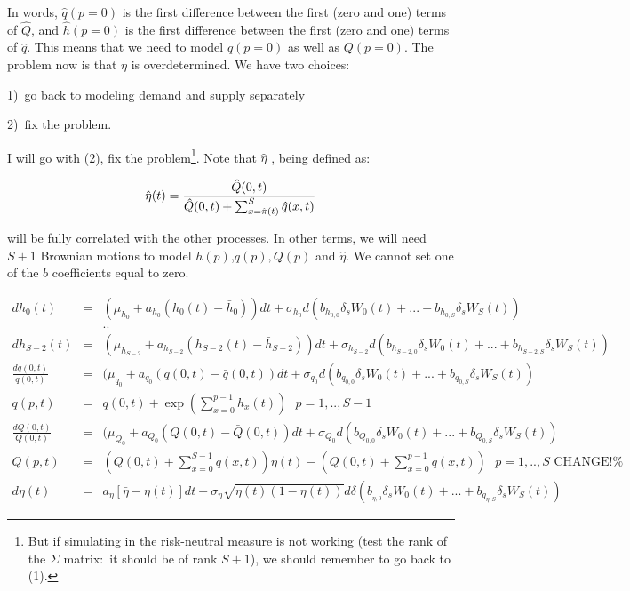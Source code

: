 \documentclass{article}
\begin{document}
In words, $\hat{q}(p=0)$ is the first difference between the first (zero and
one) terms of $\hat{Q}$, and $\hat{h}(p=0)$ is the first difference between
the first (zero and one) terms of $\hat{q}$. This means that we need to
model $q(p=0)$ as well as $Q(p=0)$. The problem now is that $\eta $ is
overdetermined. We have two choices:

1)\ go back to modeling demand and supply separately

2)\ fix the problem.

I will go with (2), fix the problem\footnote{%
But if simulating in the risk-neutral measure is not working (test the rank
of the $\Sigma $ matrix:\ it should be of rank $S+1$), we should remember to
go back to (1).}. Note that $\hat{\eta}$ , being defined as:

\begin{equation*}
\hat{\eta}(t)=\frac{\hat{Q}(0,t)}{\hat{Q}(0,t)+\sum_{x=\hat{\pi}(t)}^{S}\hat{%
q}(x,t)}
\end{equation*}

will be fully correlated with the other processes. In other terms, we will
need $S+1$ Brownian motions to model $h(p)$,$q(p),Q(p)$ and $\hat{\eta}$. We
cannot set one of the $b$ coefficients equal to zero.

\begin{eqnarray*}
dh_{0}(t) &=&(\mu _{h_{0}}+a_{h_{0}}(h_{0}(t)-\bar{h}_{0}))dt+\sigma
_{h_{0}}d(b_{h_{0,0}}\delta _{s}W_{0}(t)+...+b_{h_{0,S}}\delta _{s}W_{S}(t))
\\
&&.. \\
dh_{S-2}(t) &=&(\mu _{h_{S-2}}+a_{h_{S-2}}(h_{S-2}(t)-\bar{h}%
_{S-2}))dt+\sigma _{h_{S-2}}d(b_{h_{S-2,0}}\delta
_{s}W_{0}(t)+...+b_{h_{S-2,S}}\delta _{s}W_{S}(t)) \\
\frac{dq(0,t)}{q(0,t)} &=&(\mu _{q_{0}}+a_{q_{0}}(q(0,t)-\bar{q}%
(0,t))dt+\sigma _{q_{0}}d(b_{q_{0,0}}\delta
_{s}W_{0}(t)+...+b_{q_{0,S}}\delta _{s}W_{S}(t))\text{ \ \ \ \ } \\
q(p,t) &=&q(0,t)+\exp (\sum_{x=0}^{p-1}h_{x}(t))\text{ \ \ \ \ }p=1,..,S-1 \\
\frac{dQ(0,t)}{Q(0,t)} &=&(\mu _{Q_{0}}+a_{Q_{0}}(Q(0,t)-\bar{Q}%
(0,t))dt+\sigma _{Q_{0}}d(b_{Q_{0,0}}\delta
_{s}W_{0}(t)+...+b_{Q_{0,S}}\delta _{s}W_{S}(t)) \\
Q(p,t) &=&(Q(0,t)+\sum_{x=0}^{S-1}q(x,t))\eta
(t)-(Q(0,t)+\sum_{x=0}^{p-1}q(x,t))\text{ \ \ }p=1,..,S\text{ \ \ \ \ CHANGE!%
} \\
d\eta (t) &=&a_{\eta }[\bar{\eta}-\eta (t)]dt+\sigma _{\eta }\sqrt{\eta
(t)(1-\eta (t))}d\delta (b_{_{\eta ,0}}\delta _{s}W_{0}(t)+...+b_{q_{\eta
,S}}\delta _{s}W_{S}(t))
\end{eqnarray*}%
\bigskip 
\end{document}
